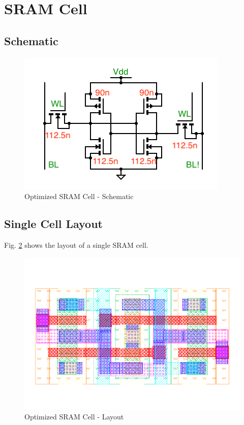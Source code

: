 \documentclass[conference]{IEEEtran}
\begin{document}
\section{SRAM Cell}
\subsection{Schematic}
\begin{figure}[h!]
\centering
\includegraphics[clip,width=\columnwidth]{SRAM6Tcell.png}
\caption{Optimized SRAM Cell - Schematic}
\label{fig:sram_cell_schematic}
\end{figure}

\subsection{Single Cell Layout}
Fig. \ref{fig:sram_cell_layout} shows the layout of a single SRAM cell.
\begin{figure}[h!]
\centering
\includegraphics[clip,width=\columnwidth]{sram_cell_full.png}
\caption{Optimized SRAM Cell - Layout}
\label{fig:sram_cell_layout}
\end{figure}
\end{document}
